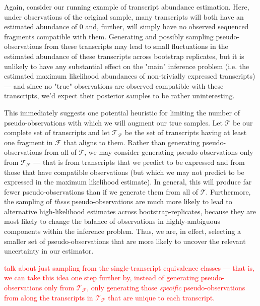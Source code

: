 Again, consider our running example of transcript abundance estimation. Here, under observations 
of the original sample, many transcripts will both have an estimated abundance of 0 and, further, 
will simply have no observed sequenced fragments compatible with them.  Generating and possibly 
sampling pseudo-observations from these transcripts may lead to small fluctuations in the estimated 
abundance of these transcripts across bootstrap replicates, but it is unlikely to have any 
substantial effect on the "main" inference problem (i.e. the estimated maximum likelihood 
abundances of non-trivially expressed transcripts) — and since no "true" observations are 
observed compatible with these transcripts, we'd expect their posterior samples to be rather 
uninteresting.

This immediately suggests one potential heuristic for limiting the number of pseudo-observations 
with which we will augment our true samples. Let $\mathcal{T}$ be our complete set of transcripts 
and let $\mathcal{T}_\mathcal{F}$ be the set of transcripts having at least one fragment in 
$\mathcal{F}$ that aligns to them.  Rather than generating pseudo-observations from all of 
$\mathcal{T}$, we may consider generating pseudo-observations only from 
$\mathcal{T}_\mathcal{F}$ — that is from transcripts that we predict to be expressed and from those 
that have compatible observations (but which we may not predict to be expressed in the maximum 
likelihood estimate). In general, this will produce far fewer pseudo-observations than if we 
generate them from all of $\mathcal{T}$. Furthermore, the sampling of \textit{these} 
pseudo-observations are much more likely to lead to alternative high-likelihood estimates across 
bootstrap-replicates, because they are most likely to change the balance of observations in 
highly-ambiguous components within the inference problem.  Thus, we are, in effect, selecting a 
smaller set of pseudo-observations that are more likely to uncover the relevant uncertainty 
in our estimator.

\textcolor{red}{talk about just sampling from the single-transcript equivalence classes — that is, we can take 
this idea one step further by, instead of generating pseudo-observations only from 
$\mathcal{T}_\mathcal{F}$, only generating those \textit{specific} pseudo-observations from along 
the transcripts in $\mathcal{T}_\mathcal{F}$ that are unique to each transcript.}